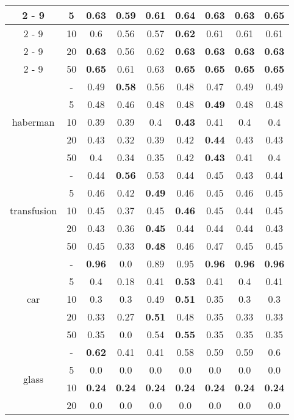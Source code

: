 \documentclass{article}%
\begin{document}
\begin{longtable}{c|c|ccccccc}
\cline{2%
-%
9}%
&5&0.63&0.59&0.61&0.64&0.63&0.63&\textbf{0.65}\\%
\cline{2%
-%
9}%
&10&0.6&0.56&0.57&\textbf{0.62}&0.61&0.61&0.61\\%
\cline{2%
-%
9}%
&20&\textbf{0.63}&0.56&0.62&\textbf{0.63}&\textbf{0.63}&\textbf{0.63}&\textbf{0.63}\\%
\cline{2%
-%
9}%
&50&\textbf{0.65}&0.61&0.63&\textbf{0.65}&\textbf{0.65}&\textbf{0.65}&\textbf{0.65}\\%
\hline%
\multirow{5}{*}{haberman}&{-}&0.49&\textbf{0.58}&0.56&0.48&0.47&0.49&0.49\\%
\cline{2%
-%
9}%
&5&0.48&0.46&0.48&0.48&\textbf{0.49}&0.48&0.48\\%
\cline{2%
-%
9}%
&10&0.39&0.39&0.4&\textbf{0.43}&0.41&0.4&0.4\\%
\cline{2%
-%
9}%
&20&0.43&0.32&0.39&0.42&\textbf{0.44}&0.43&0.43\\%
\cline{2%
-%
9}%
&50&0.4&0.34&0.35&0.42&\textbf{0.43}&0.41&0.4\\%
\hline%
\multirow{5}{*}{transfusion}&{-}&0.44&\textbf{0.56}&0.53&0.44&0.45&0.43&0.44\\%
\cline{2%
-%
9}%
&5&0.46&0.42&\textbf{0.49}&0.46&0.45&0.46&0.45\\%
\cline{2%
-%
9}%
&10&0.45&0.37&0.45&\textbf{0.46}&0.45&0.44&0.45\\%
\cline{2%
-%
9}%
&20&0.43&0.36&\textbf{0.45}&0.44&0.44&0.44&0.43\\%
\cline{2%
-%
9}%
&50&0.45&0.33&\textbf{0.48}&0.46&0.47&0.45&0.45\\%
\hline%
\multirow{5}{*}{car}&{-}&\textbf{0.96}&0.0&0.89&0.95&\textbf{0.96}&\textbf{0.96}&\textbf{0.96}\\%
\cline{2%
-%
9}%
&5&0.4&0.18&0.41&\textbf{0.53}&0.41&0.4&0.41\\%
\cline{2%
-%
9}%
&10&0.3&0.3&0.49&\textbf{0.51}&0.35&0.3&0.3\\%
\cline{2%
-%
9}%
&20&0.33&0.27&\textbf{0.51}&0.48&0.35&0.33&0.33\\%
\cline{2%
-%
9}%
&50&0.35&0.0&0.54&\textbf{0.55}&0.35&0.35&0.35\\%
\hline%
\multirow{5}{*}{glass}&{-}&\textbf{0.62}&0.41&0.41&0.58&0.59&0.59&0.6\\%
\cline{2%
-%
9}%
&5&0.0&0.0&0.0&0.0&0.0&0.0&0.0\\%
\cline{2%
-%
9}%
&10&\textbf{0.24}&\textbf{0.24}&\textbf{0.24}&\textbf{0.24}&\textbf{0.24}&\textbf{0.24}&\textbf{0.24}\\%
\cline{2%
-%
9}%
&20&0.0&0.0&0.0&0.0&0.0&0.0&0.0\\%

\end{longtable}
\end{document}
